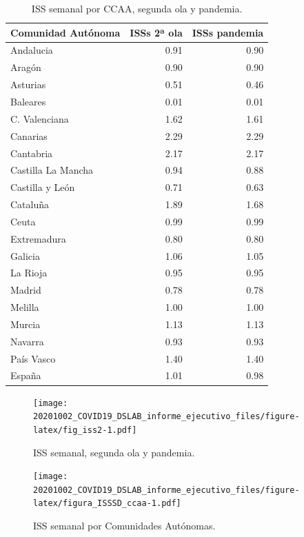 \documentclass[
  11pt,
]{article}
\begin{document}
\begin{table}[!h]

\caption{\label{tab:tabla2}ISS semanal por CCAA, segunda ola y pandemia.}
\centering
\fontsize{9}{11}\selectfont
\begin{tabular}[t]{l|r|r}
\hline
Comunidad Autónoma & ISSs 2ª ola & ISSs pandemia\\
\hline
Andalucia & 0.91 & 0.90\\
\hline
Aragón & 0.90 & 0.90\\
\hline
Asturias & 0.51 & 0.46\\
\hline
Baleares & 0.01 & 0.01\\
\hline
C. Valenciana & 1.62 & 1.61\\
\hline
Canarias & 2.29 & 2.29\\
\hline
Cantabria & 2.17 & 2.17\\
\hline
Castilla La Mancha & 0.94 & 0.88\\
\hline
Castilla y León & 0.71 & 0.63\\
\hline
Cataluña & 1.89 & 1.68\\
\hline
Ceuta & 0.99 & 0.99\\
\hline
Extremadura & 0.80 & 0.80\\
\hline
Galicia & 1.06 & 1.05\\
\hline
La Rioja & 0.95 & 0.95\\
\hline
Madrid & 0.78 & 0.78\\
\hline
Melilla & 1.00 & 1.00\\
\hline
Murcia & 1.13 & 1.13\\
\hline
Navarra & 0.93 & 0.93\\
\hline
País Vasco & 1.40 & 1.40\\
\hline
España & 1.01 & 0.98\\
\hline
\end{tabular}
\end{table}

\begin{figure}
\centering
\texttt{[image: 20201002\_COVID19\_DSLAB\_informe\_ejecutivo\_files/figure-latex/fig\_iss2-1.pdf]}
\caption{\label{fig:fig_iss2} ISS semanal, segunda ola y pandemia.}
\end{figure}

\begin{figure}
\centering
\texttt{[image: 20201002\_COVID19\_DSLAB\_informe\_ejecutivo\_files/figure-latex/figura\_ISSSD\_ccaa-1.pdf]}
\caption{\label{fig:figura_ISSSD_ccaa} ISS semanal por Comunidades
Autónomas.}
\end{figure}
\end{document}
